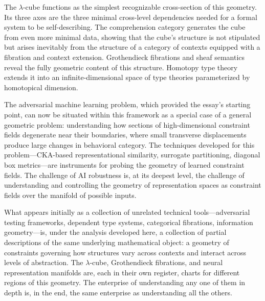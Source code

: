 \documentclass[12pt,a4paper]{article}
\theoremstyle{plain}
\theoremstyle{definition}
\begin{document}
The $\lambda$-cube functions as the simplest recognizable cross-section of this geometry. Its three axes are the three minimal cross-level dependencies needed for a formal system to be self-describing. The comprehension category generates the cube from even more minimal data, showing that the cube's structure is not stipulated but arises inevitably from the structure of a category of contexts equipped with a fibration and context extension. Grothendieck fibrations and sheaf semantics reveal the fully geometric content of this structure. Homotopy type theory extends it into an infinite-dimensional space of type theories parameterized by homotopical dimension.

The adversarial machine learning problem, which provided the essay's starting point, can now be situated within this framework as a special case of a general geometric problem: understanding how sections of high-dimensional constraint fields degenerate near their boundaries, where small transverse displacements produce large changes in behavioral category. The techniques developed for this problem---CKA-based representational similarity, surrogate partitioning, diagonal box metrics---are instruments for probing the geometry of learned constraint fields. The challenge of AI robustness is, at its deepest level, the challenge of understanding and controlling the geometry of representation spaces as constraint fields over the manifold of possible inputs.

What appears initially as a collection of unrelated technical tools---adversarial testing frameworks, dependent type systems, categorical fibrations, information geometry---is, under the analysis developed here, a collection of partial descriptions of the same underlying mathematical object: a geometry of constraints governing how structures vary across contexts and interact across levels of abstraction. The $\lambda$-cube, Grothendieck fibrations, and neural representation manifolds are, each in their own register, charts for different regions of this geometry. The enterprise of understanding any one of them in depth is, in the end, the same enterprise as understanding all the others.
\end{document}
